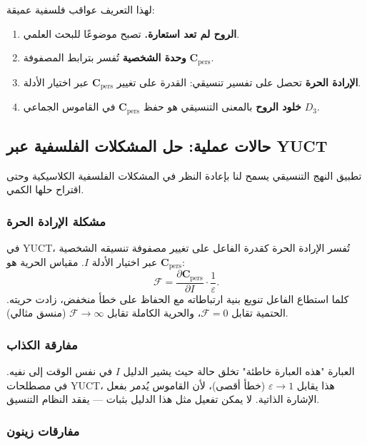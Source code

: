 \documentclass[11pt,a4paper]{article}
\newcommand{\eps}{\varepsilon}
\newcommand{\Cpers}{\mathbf{C}_{\text{pers}}}
\begin{document}
	لهذا التعريف عواقب فلسفية عميقة:
	
	\begin{enumerate}
		\item \textbf{الروح لم تعد استعارة.} تصبح موضوعًا للبحث العلمي.
		\item \textbf{وحدة الشخصية} تُفسر بترابط المصفوفة \(\Cpers\).
		\item \textbf{الإرادة الحرة} تحصل على تفسير تنسيقي: القدرة على تغيير \(\Cpers\) عبر اختيار الأدلة.
		\item \textbf{خلود الروح} بالمعنى التنسيقي هو حفظ \(\Cpers\) في القاموس الجماعي \(D_3\).
	\end{enumerate}
	
	\subsection{حالات عملية: حل المشكلات الفلسفية عبر YUCT}
	\label{sec:practical-cases}
	
	تطبيق النهج التنسيقي يسمح لنا بإعادة النظر في المشكلات الفلسفية الكلاسيكية وحتى اقتراح حلها الكمي.
	
	\subsubsection{مشكلة الإرادة الحرة}
	
	في YUCT، تُفسر الإرادة الحرة كقدرة الفاعل على تغيير مصفوفة تنسيقه الشخصية \(\Cpers\) عبر اختيار الأدلة \(I\). مقياس الحرية هو:
	\[
	\mathcal{F} = \frac{\partial \Cpers}{\partial I} \cdot \frac{1}{\eps}.
	\]
	كلما استطاع الفاعل تنويع بنية ارتباطاته مع الحفاظ على خطأ منخفض، زادت حريته. الحتمية تقابل \(\mathcal{F} = 0\)، والحرية الكاملة تقابل \(\mathcal{F} \to \infty\) (منسق مثالي).
	
	\subsubsection{مفارقة الكذاب}
	
	العبارة "هذه العبارة خاطئة" تخلق حالة حيث يشير الدليل \(I\) في نفس الوقت إلى نفيه. في مصطلحات YUCT، هذا يقابل \(\eps \to 1\) (خطأ أقصى)، لأن القاموس يُدمر بفعل الإشارة الذاتية. لا يمكن تفعيل مثل هذا الدليل بثبات — يفقد النظام التنسيق.
	
	\subsubsection{مفارقات زينون}
	
\end{document}
